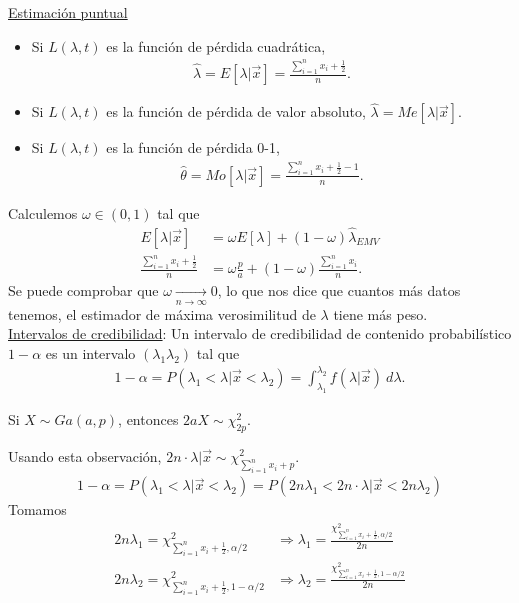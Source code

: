 \noindent \underline{Estimación puntual}
\begin{itemize}
    \item Si $L(\lambda,t)$ es la función de pérdida cuadrática, 
    \begin{align*}
        \widehat{\lambda} = E[\lambda |  \vec{x}] = \frac{\sum_{i=1}^{n} x_i + \frac{1}{2}}{n}.
    \end{align*}
    \item Si $L(\lambda,t)$ es la función de pérdida de valor absoluto, $\widehat{\lambda} = Me[\lambda | \vec{x}]$.
    \item Si $L(\lambda,t)$ es la función de pérdida 0-1,
    \begin{align*}
       \widehat{\theta} = Mo[\lambda | \vec{x}] = \frac{\sum_{i=1}^{n} x_i + \frac{1}{2} - 1}{n}.
    \end{align*}
\end{itemize}
Calculemos $\omega \in (0,1)$ tal que 
\begin{align*}
    E[\lambda  | \vec{x}] &= \omega E[\lambda]  + (1 - \omega) \widehat{\lambda }_{EMV}  \\
    \frac{\sum_{i=1}^{n} x_i + \frac{1}{2}}{n} &= \omega \frac{p}{a} + (1-\omega) \frac{\sum_{i=1}^{n} x_i}{n}.
\end{align*}
Se puede comprobar que $\omega \xrightarrow[n \to \infty]{} 0$, lo que nos dice que cuantos más datos tenemos, el estimador de máxima verosimilitud de $\lambda$ tiene más peso.
\\
\newline
\noindent \underline{Intervalos de credibilidad}: Un intervalo de credibilidad de contenido probabilístico $1-\alpha$ es un intervalo $(\lambda_1\lambda_2)$ tal que
\begin{align*}
    1 - \alpha = P(\lambda_1 < \lambda | \vec{x} < \lambda_2) = \int_{\lambda_1}^{\lambda_2} f(\lambda | \vec{x}) \ d\lambda.
\end{align*}
\begin{obs}
    Si $X \sim Ga(a,p)$, entonces $2aX \sim \chi^2_{2p}$.
\end{obs}
\noindent Usando esta observación, $2n \cdot \lambda | \vec{x} \sim \chi^2_{\sum_{i=1}^{n} x_i + p }$. 
\begin{align*}
    1 - \alpha = P(\lambda_1 < \lambda | \vec{x} < \lambda_2) = P(2n\lambda_1 < 2n\cdot\lambda | \vec{x} < 2n \lambda_2)
\end{align*}
Tomamos 
\begin{align*}
    2n\lambda_1 = \chi^2_{\sum_{i=1}^{n} x_i + \frac{1}{2}, \alpha/2 } &\Longrightarrow \lambda_1 = \frac{\chi^2_{\sum_{i=1}^{n} x_i + \frac{1}{2}, \alpha/2 }}{2n} \\
    2n\lambda_2 = \chi^2_{\sum_{i=1}^{n} x_i + \frac{1}{2}, 1- \alpha/2 } &\Longrightarrow \lambda_2 = \frac{\chi^2_{\sum_{i=1}^{n} x_i + \frac{1}{2}, 1- \alpha/2 }}{2n}
\end{align*}
